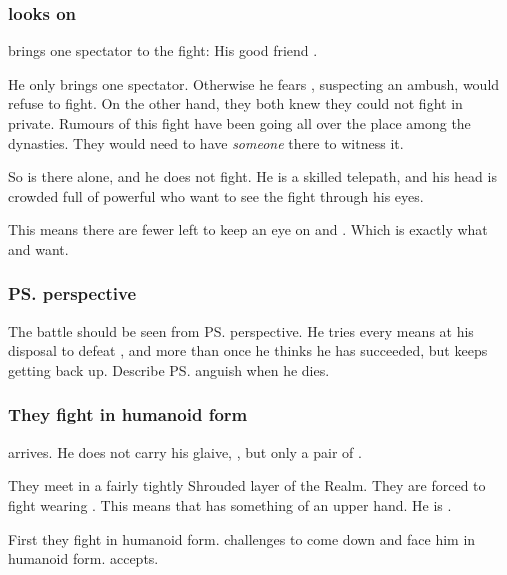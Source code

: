 \subsubsection{\Menessiaraid looks on}
\Teshrial{} brings one spectator to the fight: 
His good friend \Menessiaraid. 

He only brings one spectator. 
Otherwise he fears \Ishnaruchaefir, suspecting an ambush, would refuse to fight. 
On the other hand, they both knew they could not fight in private. 
Rumours of this fight have been going all over the place among the dynasties. 
They would need to have \emph{someone} there to witness it. 

So \Menessiaraid{} is there alone, and he does not fight. 
He is a skilled telepath, and his head is crowded full of powerful \resphain{} who want to see the fight through his eyes. 

This means there are fewer \resphain{} left to keep an eye on \Forclin{} and \Malcur. 
Which is exactly what \Ishnaruchaefir{} and \Secherdamon{} want. 





\subsubsection{\ps{\Teshrial} perspective}
The battle should be seen from \ps{\Teshrial} perspective. 
He tries every means at his disposal to defeat \Ishnaruchaefir, and more than once he thinks he has succeeded, but \Ishnaruchaefir{} keeps getting back up. 
Describe \ps{\Teshrial} anguish when he dies. 





\subsubsection{They fight in humanoid form}
\Ishnaruchaefir{} arrives. 
He does not carry his glaive, \Rystessakhin, but only a pair of \skekrathuins. 

They meet in a fairly tightly Shrouded layer of the Realm. 
They are forced to fight wearing . 
This means that \Teshrial{} has something of an upper hand. 
He is . 

First they fight in humanoid form. 
\Teshrial{} challenges \Ishnaruchaefir{} to come down and face him in humanoid form. 
\Ishnaruchaefir{} accepts. 


